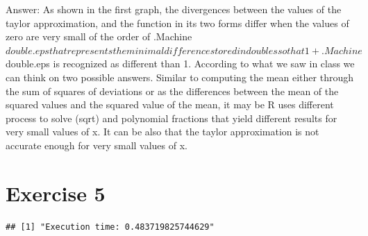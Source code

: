 \documentclass[
]{article}
\newenvironment{Shaded}{\begin{snugshade}}{\end{snugshade}}
\newcommand{\AttributeTok}[1]{\textcolor[rgb]{0.13,0.29,0.53}{#1}}
\newcommand{\CommentTok}[1]{\textcolor[rgb]{0.56,0.35,0.01}{\textit{#1}}}
\newcommand{\FunctionTok}[1]{\textcolor[rgb]{0.13,0.29,0.53}{\textbf{#1}}}
\newcommand{\NormalTok}[1]{#1}
\newcommand{\OtherTok}[1]{\textcolor[rgb]{0.56,0.35,0.01}{#1}}
\newcommand{\SpecialCharTok}[1]{\textcolor[rgb]{0.81,0.36,0.00}{\textbf{#1}}}
\newcommand{\StringTok}[1]{\textcolor[rgb]{0.31,0.60,0.02}{#1}}
\begin{document}
Answer: As shown in the first graph, the divergences between the values
of the taylor approximation, and the function in its two forms differ
when the values of zero are very small of the order of
.Machine\(double.eps that
represents the minimal difference stored in doubles so that 1 + .Machine\)double.eps
is recognized as different than 1. According to what we saw in class we
can think on two possible answers. Similar to computing the mean either
through the sum of squares of deviations or as the differences between
the mean of the squared values and the squared value of the mean, it may
be R uses different process to solve (sqrt) and polynomial fractions
that yield different results for very small values of x. It can be also
that the taylor approximation is not accurate enough for very small
values of x.

\section{Exercise 5}\label{exercise-5}

\begin{Shaded}
\end{Shaded}

\begin{verbatim}
## [1] "Execution time: 0.483719825744629"
\end{verbatim}
\end{document}
